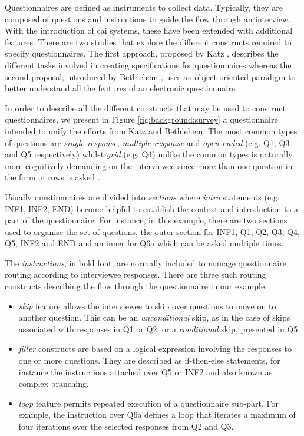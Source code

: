 	Questionnaires are defined as instruments to collect data. Typically, they are composed of questions and instructions to guide the flow through an interview. With the introduction of \gls{cai} systems, these have been extended with additional features. There are two studies that explore the different constructs required to specify questionnaires. The first approach, proposed by Katz \cite{proc:katz97}, describes the different tasks involved in creating specifications for questionnaires whereas the second proposal, introduced by Bethlehem \cite{proc:bethlehem00}, uses an object-oriented paradigm to better understand all the features of an electronic questionnaire.

	In order to describe all the different constructs that may be used to construct questionnaires, we present in Figure \ref{fig:background:survey} a questionnaire intended to unify the efforts from Katz and Bethlehem. The most common types of questions are \emph{single-response}, \emph{multiple-response} and \emph{open-ended} (e.g. Q1, Q3 and Q5 respectively) whilst \emph{grid} (e.g. Q4) unlike the common types is naturally more cognitively demanding on the interviewee since more than one question in the form of rows is asked \cite{web:bock13}.

	Usually questionnaires are divided into \emph{sections} where \emph{intro} statements (e.g. INF1, INF2, END) become helpful to establish the context and introduction to a part of the questionnaire. For instance, in this example, there are two sections used to organise the set of questions, the outer section for INF1, Q1, Q2, Q3, Q4, Q5, INF2 and END and an inner for Q6a which can be asked multiple times. 

	The \emph{instructions}, in bold font, are normally included to manage questionnaire routing according to interviewee responses. There are three such routing constructs describing the flow through the questionnaire in our example:

	\begin{itemize}
		\item \emph{skip} feature allows the interviewee to skip over questions to move on to another question. This can be an \emph{unconditional} skip, as in the case of skips associated with responses in Q1 or Q2; or a \emph{conditional} skip, presented in Q5.
		\item \emph{filter} constructs are based on a logical expression involving the responses to one or more questions. They are described as if-then-else statements, for instance the instructions attached over Q5 or INF2 and also known as complex branching.
		\item \emph{loop} feature permits repeated execution of a questionnaire sub-part. For example, the instruction over Q6a defines a loop that iterates a maximum of four iterations over the selected responses from Q2 and Q3.
	\end{itemize}

